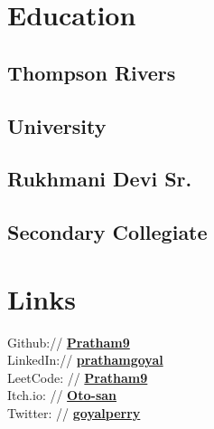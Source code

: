 \documentclass[]{pratham-resume-openfont}
\begin{document}
%
%

%
%

%
%

\begin{minipage}[t]{0.34\textwidth} 


\section{Education} 

\subsection{Thompson Rivers}
\subsection{University}
\sectionsep

\subsection{Rukhmani Devi Sr.}
\subsection{Secondary Collegiate}
\sectionsep


\section{Links} 
Github:// \href{https://https://github.com/Pratham9}{\bf Pratham9} \\
LinkedIn://  \href{https://www.linkedin.com/in/prathamgoyal}{\bf prathamgoyal} \\
LeetCode: // \href{https://leetcode.com/Pratham9/}{\bf Pratham9} \\
Itch.io: // \href{https://oto-san.itch.io/}{\bf Oto-san} \\
Twitter: // \href{https://twitter.com/GoreKehnePerry}{\bf goyalperry} \\
\sectionsep


\end{minipage}
\end{document}
